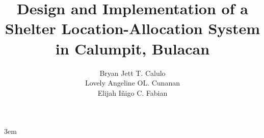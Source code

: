 \documentclass[hidelinks,letterpaper,12pt]{bulsuthesis}
\title{Design and Implementation of a Shelter Location-Allocation System in Calumpit, Bulacan} %
\author{%
	Bryan Jett T. Calulo
	
	Lovely Angeline OL. Cunanan
	
	Elijah Iñigo C. Fabian
}
\begin{document}
	\emergencystretch 3em
	\renewcommand{\contentsname}{TABLE OF CONTENTS}
	\renewcommand{\listtablename}{LIST OF TABLES}
	\renewcommand{\listfigurename}{LIST OF FIGURES}
	\setlength{\cftbeforechapskip}{3pt}
	
	\doublespacing
	\begin{preliminary}
		\maketitle
%		
%		
%		
%		
%		
%		
	\end{preliminary}
	
	
	
	
	
	
	
	
	
	
%	
%	
%	
%	
	
\end{document}
